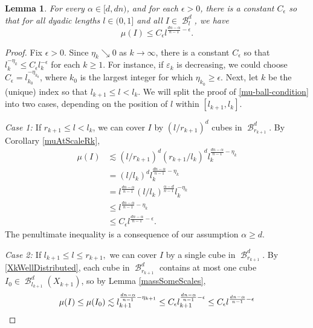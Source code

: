 \documentclass[dvipsnames,letterpaper,12pt]{article}
\numberwithin{equation}{section}
\theoremstyle{plain}
\newtheorem{lemma}{Lemma}
\theoremstyle{remark}
\DeclareMathOperator{\B}{\mathcal{B}}
\begin{document}
\begin{lemma} \label{frostmanBound}
For every $\alpha \in [d, dn)$, and for each $\epsilon>0$, there is a constant $C_\epsilon$ so that for all dyadic lengths $l\in (0,1]$ and all $I \in \B_l^d$, we have
	\begin{equation} 
	\mu(I) \leq C_{\epsilon} l^{\frac{dn - \alpha}{n - 1} - \epsilon}. \label{mu-ball-condition} 
	\end{equation} 
\end{lemma}
\begin{proof}
	Fix $\epsilon > 0$. Since $\eta_k \searrow 0$ as $k\to\infty$, there is a constant $C_{\epsilon}$ so that $l_k^{-\eta_k}\leq C_{\epsilon}l_k^{-\epsilon}$ for each $k \geq 1$. For instance, if $\varepsilon_k$ is decreasing, we could choose $C_{\epsilon}=l_{k_0}^{-\eta_{k_0}}$, where $k_0$ is the largest integer for which $\eta_{k_0} \geq \epsilon$. Next, let $k$ be the (unique) index so that $l_{k+1} \leq l < l_{k}$. We will split the proof of \eqref{mu-ball-condition} into two cases, depending on the position of  $l$ within $[l_{k+1}, l_k]$. 

	{\em{Case 1: }} If $r_{k+1} \leq l < l_k$, 
	we can cover $I$ by $(l/r_{k+1})^d$ cubes in $\B^d_{r_{k+1}}$. By Corollary \ref{muAtScaleRk},
	\begin{equation}
	\begin{split}
	\mu(I) & \lesssim (l/r_{k+1})^d (r_{k+1}/l_k)^d l_k^{\frac{dn-\alpha}{n-1}-\eta_k} \\
	& = (l/l_k)^d l_k^{\frac{dn-\alpha}{n-1}-\eta_{k}}\\
	& = l^{\frac{dn-\alpha}{n-1}} (l/l_k)^{\frac{\alpha - d}{n-1}} l_k^{-\eta_k}\\
	& \leq l^{\frac{dn-\alpha}{n-1} - \eta_k}  \\
	& \leq C_{\epsilon}l^{\frac{dn-\alpha}{n-1}-\epsilon}.
	\end{split}
	\end{equation}
The penultimate inequality is a consequence of our assumption $\alpha \geq d$. 

	{\em{Case 2: }} If $l_{k+1} \leq l \leq r_{k+1},$ we can cover $I$ by a single cube in $\B^d_{r_{k+1}}$. By \eqref{XkWellDistributed}, each cube in $\B^d_{r_{k+1}}$ contains at most one cube $I_0 \in \B^d_{l_{k+1}}(X_{k+1})$, so by Lemma \ref{massSomeScales},
	\[ 
		\mu(I) \leq \mu(I_0) \lesssim l_{k+1}^{\frac{dn - \alpha}{n - 1} - \eta_{k+1}} 
		\leq C_{\epsilon}l_{k+1}^{\frac{dn - \alpha}{n - 1} - \epsilon}
		\leq C_{\epsilon}l^{\frac{dn - \alpha}{n - 1} - \epsilon}\qedhere
	\]

\end{proof}
\end{document}
